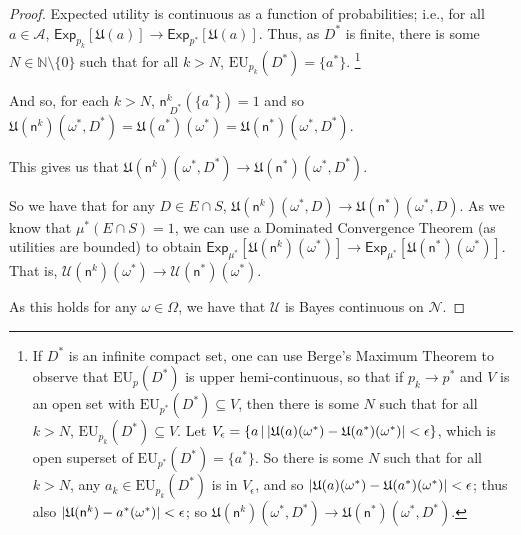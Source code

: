 \documentclass[a4paper]{article}
\newcommand\A{\mathcal{A}}
\newcommand\Exp{\mathsf{Exp}}
\newcommand\EU{\mathrm{EU}}
\newcommand\U{\mathfrak{U}} %
\newcommand\Uwald{\mathcal{U}} %
\newcommand{\n}{\mathsf{n}}
\renewcommand{\nu}{\n}
\newcommand\Nu{\mathcal{N}}
\renewcommand{\color}[1]{}
\newenvironment{colored}[1]{\leavevmode\color{#1}}{}
\newcommand\SetDelimiter[1][]{
	\nonscript\,#1\vert \allowbreak \nonscript\,\mathopen{}}
\providecommand\given{\SetDelimiter}
\DeclarePairedDelimiter\abs{\lvert}{\rvert}%
\newenvironment{CCM rewritten}
{\begingroup\color{blue}} %
{\endgroup}              %
\begin{document}
\begin{colored}{violet}
\begin{proof}
Expected utility is continuous as a function of probabilities; i.e., for all $a\in\A$, $\Exp_{p_k}[\U(a)]\longrightarrow \Exp_{p^*}[\U(a)]$. Thus, as $D^*$ is finite, there is some $N\in\mathbb{N}\setminus\{0\}$ such that for all $k>N$, $\EU_{p_k}(D^*)=\{a^*\}$.%
\footnote{If $D^*$ is an infinite  compact set, one can use Berge's Maximum Theorem to observe that $\EU_p(D^*)$ is upper hemi-continuous, so that if $p_k\longrightarrow p^*$ and $V$ is an open set with $\EU_{p^*}(D^*)\subseteq V$, then there is some $N$ such that for all $k>N$, $\EU_{p_k}(D^*)\subseteq V$. Let $V_{\epsilon}=\{a\given \abs{\U(a)(\omega^*)-\U(a^*)(\omega^*)}<\epsilon\}$, which is open superset of $\EU_{p^*}(D^*)=\{a^*\}$. So there is some $N$ such that for all $k>N$, any $a_k\in\EU_{p_k}(D^*)$ is in $V_{\epsilon}$, and so $\abs{\U(a)(\omega^*)-\U(a^*)(\omega^*)}<\epsilon$; thus also $\abs{\U(\nu^k)- a^*(\omega^*)}<\epsilon$; so $\U(\nu^k)(\omega^*,D^*)\longrightarrow\U(\nu^*)(\omega^*,D^*)$. } 

And so, for each $k>N$, $\nu^k_{\;D^*}(\{a^*\})=1$ and  so $\U(\nu^k)(\omega^*,D^*)=\U(a^*)(\omega^*)=\U(\nu^*)(\omega^*,D^*)$. 

This gives us that $\U(\nu^k)(\omega^*,D^*)\longrightarrow\U(\nu^*)(\omega^*,D^*)$. 

So we have that for any  $D\in E\cap S$, $\U(\nu^k)(\omega^*,D)\longrightarrow\U(\nu^*)(\omega^*,D)$.
As we know that  $\mu^*(E\cap S)=1$, we can use a Dominated Convergence Theorem (as utilities are bounded) to obtain
$\Exp_{\mu^*}[\U(\nu^k)(\omega^*)]\longrightarrow\Exp_{\mu^*}[\U(\nu^*)(\omega^*)]$. That is, $\Uwald(\nu^k)(\omega^*)\longrightarrow\Uwald(\nu^*)(\omega^*)$. 

As this holds for any $\omega\in\Omega$, we have that $\Uwald$ is Bayes continuous on $\Nu$. 
\end{proof}
\end{colored}
\end{document}
